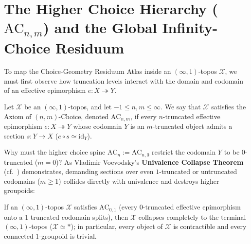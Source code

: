 \section{The Higher Choice Hierarchy ($\mathrm{AC}_{n, m}$) and the Global Infinity-Choice Residuum}\label{sec:higher-choice}

To map the Choice-Geometry Residuum Atlas inside an $(\infty, 1)$-topos $\mathcal{X}$, we must first observe how truncation levels interact with the domain and codomain of an effective epimorphism $e: X \twoheadrightarrow Y$.

\begin{definition}\label{def:bigraded-choice}

Let $\mathcal{X}$ be an $(\infty, 1)$-topos, and let $-1 \le n, m \le \infty$. We say that $\mathcal{X}$ satisfies the Axiom of $(n, m)$-Choice, denoted $\mathrm{AC}_{n, m}$, if every $n$-truncated effective epimorphism $e: X \twoheadrightarrow Y$ whose codomain $Y$ is an $m$-truncated object admits a section $s: Y \to X$ ($e \circ s \simeq \mathrm{id}_Y$).

\end{definition}

Why must the higher choice spine $\mathrm{AC}_n := \mathrm{AC}_{n, 0}$ restrict the codomain $Y$ to be $0$-truncated ($m = 0$)? As Vladimir Voevodsky's \textbf{Univalence Collapse Theorem}~\cite[Ex.~3.8.5]{HoTT13} (cf.~\cite[\S\S 5.5.6, 6.5]{Lurie09}) demonstrates, demanding sections over even $1$-truncated or untruncated codomains ($m \ge 1$) collides directly with univalence and destroys higher groupoids:

\begin{proposition}\label{prop:untruncated-degeneracy}

If an $(\infty, 1)$-topos $\mathcal{X}$ satisfies $\mathrm{AC}_{0, 1}$ (every $0$-truncated effective epimorphism onto a $1$-truncated codomain splits), then $\mathcal{X}$ collapses completely to the terminal $(\infty, 1)$-topos ($\mathcal{X} \simeq *$); in particular, every object of $\mathcal{X}$ is contractible and every connected $1$-groupoid is trivial.

\end{proposition}

